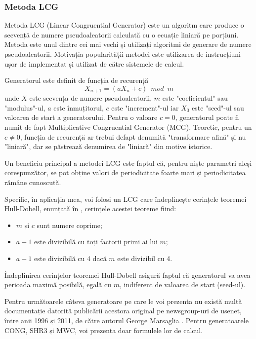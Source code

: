 \subsubsection{Metoda LCG}

Metoda LCG (Linear Congruential Generator) este un algoritm care produce o secvență de numere pseudoaleatorii calculată cu o ecuație liniară pe porțiuni. Metoda este unul dintre cei mai vechi și utilizați algoritmi de generare de numere pseudoaleatorii. Motivația popularității metodei este utilizarea de instrucțiuni ușor de implementat și utilizat de către sistemele de calcul. 

Generatorul este definit de funcția de recurență 
\[
X_{n+1} = (aX_n + c) \enspace mod \enspace m
\]
unde $X$ este secvența de numere pseudoaleatorii, $m$ este "coeficientul" sau "modulus"-ul, $a$ este înmuțitorul, $c$ este "increment"-ul iar $X_0$ este "seed"-ul sau valoarea de start a generatorului. Pentru o valoare $c = 0$, generatorul poate fi numit de fapt Multiplicative Congruential Generator (MCG). Teoretic, pentru un $c \neq 0$, funcția de recurență ar trebui defapt denumită "transformare afină" și nu "liniară", dar se păstrează denumirea de "liniară" din motive istorice.

Un beneficiu principal a metodei LCG este faptul că, pentru niște parametri aleși corespunzător, se pot obține valori de periodicitate foarte mari și periodicitatea rămâne cunoscută. 

Specific, în aplicația mea, voi folosi un LCG care îndeplinește cerințele teoremei Hull-Dobell, enunțată în \cite{HullDobellRNGs}, cerințele acestei teoreme fiind:
\begin{itemize}
    \item $m$ și $c$ sunt numere coprime;
    \item $a-1$ este divizibilă cu toți factorii primi ai lui $m$;
    \item $a-1$ este divizibilă cu 4 dacă $m$ este divizibil cu 4.
\end{itemize}

Îndeplinirea cerințelor teoremei Hull-Dobell asigură faptul că generatorul va avea perioada maximă posibilă, egală cu $m$, indiferent de valoarea de start (seed-ul). 


Pentru următoarele câteva generatoare pe care le voi prezenta nu există multă documentație datorită publicării acestora original pe newsgroup-uri de usenet, între anii 1996 și 2011, de către autorul George Marsaglia \cite{misc:usenet:GeorgeMarsaglia}. Pentru generatoarele CONG, SHR3 și MWC, voi prezenta doar formulele lor de calcul. 

